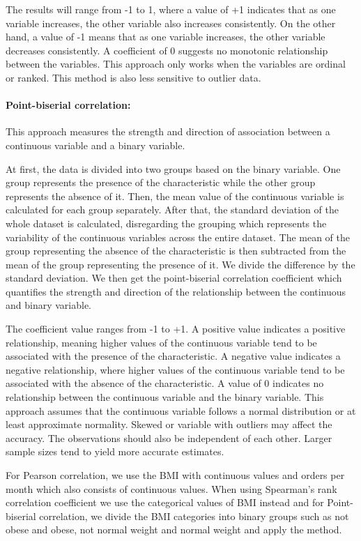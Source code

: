 \documentclass[a4paper,fleqn]{cas-sc}
\begin{document}
The results will range from -1 to 1, where a  value of +1 indicates that as one variable increases, the other variable also increases consistently. On the other hand, a value of -1 means that as one variable increases, the other variable decreases consistently. A coefficient of 0 suggests no monotonic relationship between the variables. This approach only works when the variables are ordinal or ranked. This method is also less sensitive to outlier data. 

\paragraph{Point-biserial correlation:}
This approach measures the strength and direction of association between a continuous variable and a binary variable. 

At first, the data is divided into two groups based on the binary variable. One group represents the presence of the characteristic while the other group represents the absence of it. Then, the mean value of the continuous variable is calculated for each group separately. After that, the standard deviation of the whole dataset is calculated, disregarding the grouping which represents the variability of the continuous variables across the entire dataset. The mean of the group representing the absence of the characteristic is then subtracted from the mean of the group representing the presence of it. We divide the difference by the standard deviation. We then get the point-biserial correlation coefficient which quantifies the strength and direction of the relationship between the continuous and binary variable.

The coefficient value ranges from -1 to +1. A positive value indicates a positive relationship, meaning higher values of the continuous variable tend to be associated with the presence of the characteristic. A negative value indicates a negative relationship, where higher values of the continuous variable tend to be associated with the absence of the characteristic. A value of 0 indicates no relationship between the continuous variable and the binary variable. This approach assumes that the continuous variable follows a normal distribution or at least approximate normality. Skewed or variable with outliers may affect the accuracy. The observations should also be independent of each other. Larger sample sizes tend to yield more accurate estimates. 

For Pearson correlation, we use the BMI with continuous values and orders per month which also consists of continuous values. When using Spearman's rank correlation coefficient we use the categorical values of BMI instead and for Point-biserial correlation, we divide the BMI categories into binary groups such as not obese and obese, not normal weight and normal weight and apply the method. 
\end{document}

